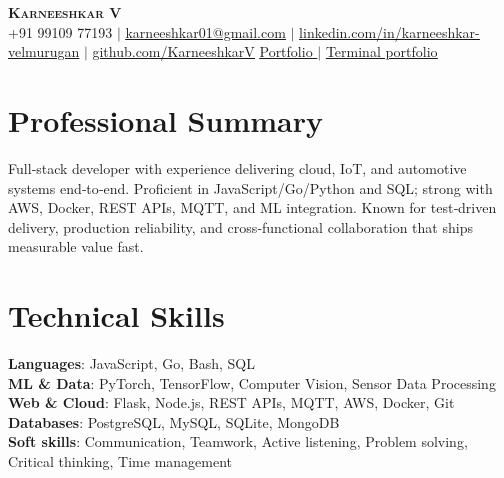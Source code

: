 \documentclass[letterpaper,11pt]{article}
\begin{document}
\begin{center}
  \textbf{\Huge \scshape Karneeshkar V} \\ \vspace{1pt}
  \small +91 99109 77193 $|$ 
  \href{mailto:karneeshkar01@gmail.com}{\underline{karneeshkar01@gmail.com}} $|$
  \href{https://www.linkedin.com/in/karneeshkar-velmurugan/}{\underline{linkedin.com/in/karneeshkar-velmurugan}} $|$
  \href{https://github.com/KarneeshkarV}{\underline{github.com/KarneeshkarV}} 
\newline \newline
\href{https://karneeshkar.tech/}{\underline{Portfolio}  }$|$
\href{https://www.karneeshkar.tech/#terminal}{\underline{Terminal portfolio}}
\end{center}

\section{Professional Summary}
Full‑stack developer with experience delivering cloud, IoT, and automotive systems end‑to‑end. Proficient in JavaScript/Go/Python and SQL; strong with AWS, Docker, REST APIs, MQTT, and ML integration. Known for test‑driven delivery, production reliability, and cross‑functional collaboration that ships measurable value fast.

\section{Technical Skills}
\begin{itemize}[leftmargin=0.15in, label={}]
  \small{\item{
    \textbf{Languages}{: JavaScript, Go, Bash, SQL} \\
    \textbf{ML \& Data}{: PyTorch, TensorFlow, Computer Vision, Sensor Data Processing} \\
    \textbf{Web \& Cloud}{: Flask, Node.js, REST APIs, MQTT, AWS, Docker, Git} \\
    \textbf{Databases}{: PostgreSQL, MySQL, SQLite, MongoDB}\\
              \textbf{Soft skills}{: Communication, Teamwork, Active listening, Problem solving, Critical thinking, Time management}}}
\end{itemize}

\end{document}

